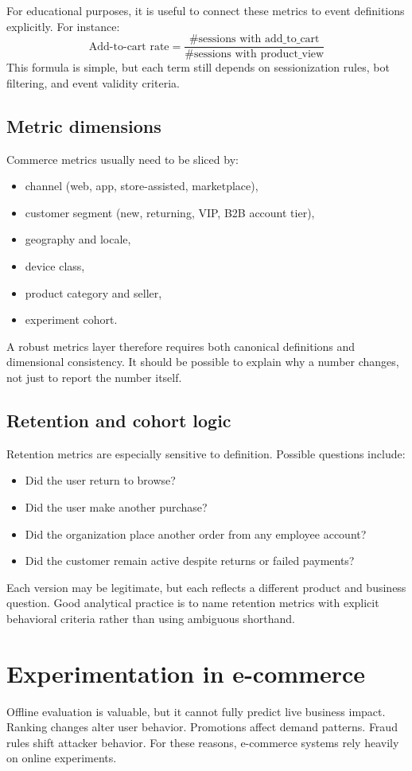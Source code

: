 For educational purposes, it is useful to connect these metrics to event definitions explicitly.
For instance:
\[
\text{Add-to-cart rate}=\frac{\#\text{sessions with add\_to\_cart}}{\#\text{sessions with product\_view}}
\]
This formula is simple, but each term still depends on sessionization rules, bot filtering, and event validity criteria.

\subsection{Metric dimensions}
Commerce metrics usually need to be sliced by:
\begin{itemize}
  \item channel (web, app, store-assisted, marketplace),
  \item customer segment (new, returning, VIP, B2B account tier),
  \item geography and locale,
  \item device class,
  \item product category and seller,
  \item experiment cohort.
\end{itemize}

A robust metrics layer therefore requires both canonical definitions and dimensional consistency.
It should be possible to explain why a number changes, not just to report the number itself.

\subsection{Retention and cohort logic}
Retention metrics are especially sensitive to definition.
Possible questions include:
\begin{itemize}
  \item Did the user return to browse?
  \item Did the user make another purchase?
  \item Did the organization place another order from any employee account?
  \item Did the customer remain active despite returns or failed payments?
\end{itemize}

Each version may be legitimate, but each reflects a different product and business question.
Good analytical practice is to name retention metrics with explicit behavioral criteria rather than using ambiguous shorthand.

\section{Experimentation in e-commerce}
Offline evaluation is valuable, but it cannot fully predict live business impact.
Ranking changes alter user behavior.
Promotions affect demand patterns.
Fraud rules shift attacker behavior.
For these reasons, e-commerce systems rely heavily on online experiments.

